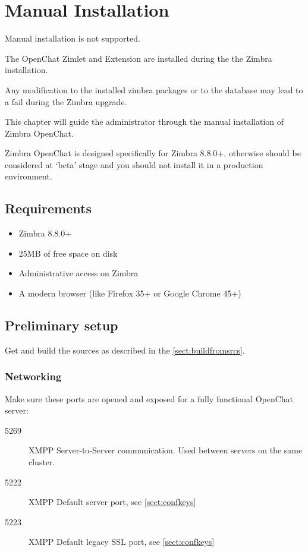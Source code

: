 \section{Manual Installation}

\begin{comment}
WARNING:
\end{comment}
\begin{warning}
    Manual installation is not supported.

    The OpenChat Zimlet and Extension are installed during the the Zimbra installation.

    Any modification to the installed zimbra packages or to the database may lead to a fail during the Zimbra upgrade.
\end{warning}

This chapter will guide the administrator through the manual installation of Zimbra OpenChat.

Zimbra OpenChat is designed specifically for Zimbra 8.8.0+, otherwise should be considered at `beta'
stage and you should not install it in a production environment.

\subsection{Requirements}
    \begin{itemize}
        \item Zimbra 8.8.0+
        \item 25MB of free space on disk
        \item Administrative access on Zimbra
        \item A modern browser (like Firefox 35+ or Google Chrome 45+)
    \end{itemize}

\subsection{Preliminary setup}

    Get and build the sources as described in the \autoref{sect:buildfromsrcs}.

\subsubsection{Networking}

    Make sure these ports are opened and exposed for a fully functional OpenChat server:
    \begin{description}
        \item [5269] XMPP Server-to-Server communication. Used between servers on the same cluster.
        \item [5222] XMPP Default server port, see \autoref{sect:confkeys}
        \item [5223] XMPP Default legacy SSL port, see \autoref{sect:confkeys}
    \end{description}


